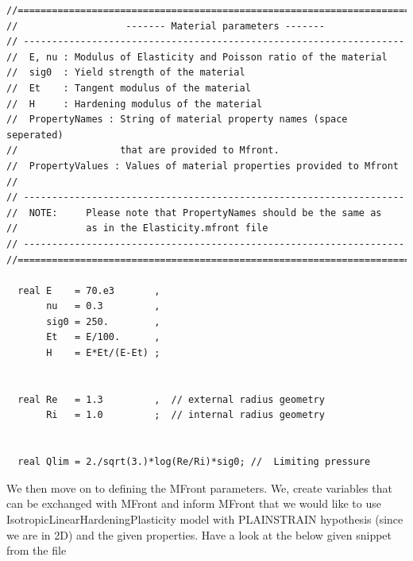 \begin{lstlisting}[style=CppStyle]
//============================================================================
//                   ------- Material parameters -------                      
// -------------------------------------------------------------------        
//  E, nu : Modulus of Elasticity and Poisson ratio of the material           
//  sig0  : Yield strength of the material                                    
//  Et    : Tangent modulus of the material                                   
//  H     : Hardening modulus of the material                                 
//  PropertyNames : String of material property names (space seperated)       
//                  that are provided to Mfront.                              
//  PropertyValues : Values of material properties provided to Mfront         
//                                                                            
// -------------------------------------------------------------------        
//  NOTE:     Please note that PropertyNames should be the same as            
//            as in the Elasticity.mfront file                                
// -------------------------------------------------------------------        
//============================================================================
                                                                              
  real E    = 70.e3       ,                                                   
       nu   = 0.3         ,                                                   
       sig0 = 250.        ,                                                   
       Et   = E/100.      ,                                                   
       H    = E*Et/(E-Et) ;                                                   
                                                                              
                                                                              
  real Re   = 1.3         ,  // external radius geometry                      
       Ri   = 1.0         ;  // internal radius geometry                      
                                                                              
                                                                              
  real Qlim = 2./sqrt(3.)*log(Re/Ri)*sig0; //  Limiting pressure 
\end{lstlisting}

We then move on to defining the MFront parameters. We, create variables
that can be exchanged with MFront and inform MFront that we would like
to use IsotropicLinearHardeningPlasticity model with PLAINSTRAIN
hypothesis (since we are in 2D) and the given properties. Have a look at
the below given snippet from the file 


